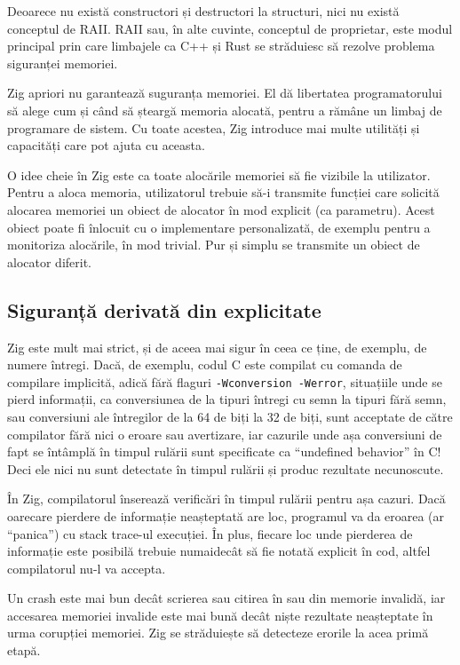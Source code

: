 \documentclass[a4paper,12pt]{report}
\begin{document}
Deoarece nu există constructori și destructori la structuri,
nici nu există conceptul de \ac{RAII}.
\ac{RAII} sau, în alte cuvinte, conceptul de proprietar, este modul principal
prin care limbajele ca C++ și Rust se străduiesc să rezolve problema siguranței memoriei.

Zig apriori nu garantează suguranța memoriei.
El dă libertatea programatorului să alege cum și când să șteargă memoria alocată,
pentru a rămâne un limbaj de programare de sistem.
Cu toate acestea, Zig introduce mai multe utilități și capacități care pot ajuta cu aceasta.

O idee cheie în Zig este ca toate alocările memoriei să fie vizibile la utilizator.
Pentru a aloca memoria, utilizatorul trebuie să-i transmite funcției care solicită alocarea memoriei
un obiect de alocator în mod explicit (ca parametru).
Acest obiect poate fi înlocuit cu o implementare personalizată,
de exemplu pentru a monitoriza alocările, în mod trivial.
Pur și simplu se transmite un obiect de alocator diferit.


\subsection{Siguranță derivată din explicitate}

Zig este mult mai strict, și de aceea mai sigur în ceea ce ține, de exemplu, de numere întregi.
Dacă, de exemplu, codul C este compilat cu comanda de compilare implicită,
adică fără flaguri \texttt{-Wconversion -Werror}, situațiile unde se pierd informații,
ca conversiunea de la tipuri întregi cu semn la tipuri fără semn, sau conversiuni ale întregilor
de la 64 de biți la 32 de biți, sunt acceptate de către compilator fără nici o eroare sau avertizare,
iar cazurile unde așa conversiuni de fapt se întâmplă în timpul rulării
sunt specificate ca ``undefined behavior'' în C!
Deci ele nici nu sunt detectate în timpul rulării și produc rezultate necunoscute.

În Zig, compilatorul înserează verificări în timpul rulării pentru așa cazuri.
Dacă oarecare pierdere de informație neașteptată are loc,
programul va da eroarea (ar ``panica'') cu stack trace-ul execuției.
În plus, fiecare loc unde pierderea de informație este posibilă trebuie numaidecât
să fie notată explicit în cod, altfel compilatorul nu-l va accepta.

Un crash este mai bun decât scrierea sau citirea în sau din memorie invalidă,
iar accesarea memoriei invalide este mai bună decât niște rezultate neașteptate
în urma corupției memoriei.
Zig se străduiește să detecteze erorile la acea primă etapă.
\end{document}
